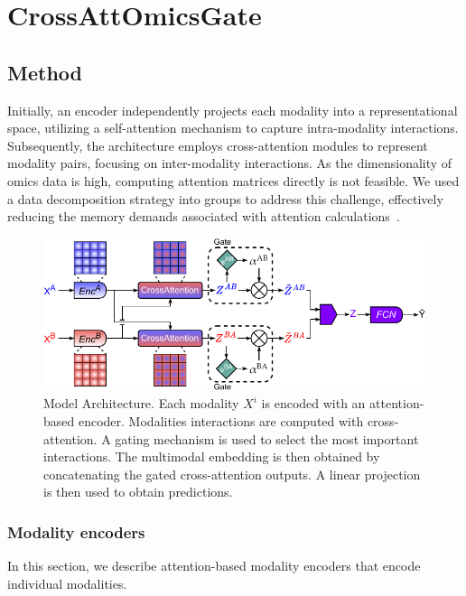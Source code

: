\documentclass[../main.tex]{subfiles}
\begin{document}
\chapter{CrossAttOmicsGate}\label{chap:crossattomicsgate}
\minitocpage

\section{Method}
 Initially, an encoder independently projects each modality into a representational space, utilizing a self-attention mechanism to capture intra-modality interactions.
 Subsequently, the architecture employs cross-attention modules to represent modality pairs, focusing on inter-modality interactions.
 As the dimensionality of omics data is high, computing attention matrices directly is not feasible.
 We used a data decomposition strategy into groups to address this challenge, effectively reducing the memory demands associated with attention calculations~\cite{AttOmics}.

 \begin{figure}[htbp]
     \centering
     \includegraphics[width=\textwidth]{CrossAttOmicsGate.pdf}
     \caption{Model Architecture. Each modality \(X^i\) is encoded with an attention-based encoder. Modalities interactions are computed with cross-attention. A gating mechanism is used to select the most important interactions. The multimodal embedding is then obtained by concatenating the gated cross-attention outputs. A linear projection is then used to obtain predictions.}
     \label{fig:arch}
 \end{figure}

 \subsection{Modality encoders}
     In this section, we describe attention-based modality encoders that encode individual modalities.
\end{document}
